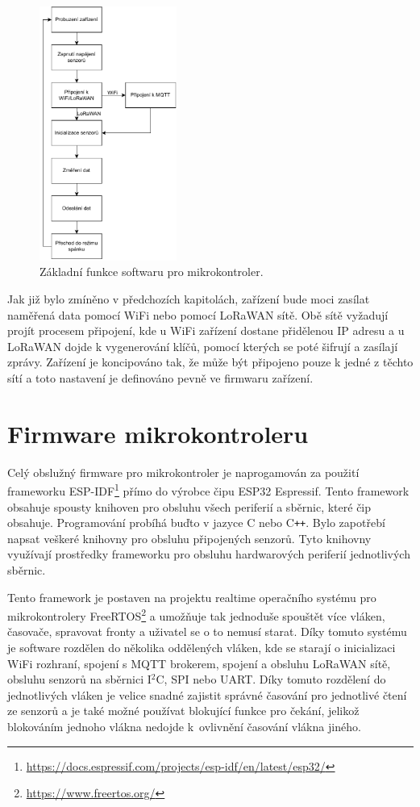 \begin{figure}[h]
    \centering
    \includegraphics[width=0.4\textwidth]{obrazky/flowchart.pdf}
    \caption{Základní funkce softwaru pro mikrokontroler.}
    \label{fig_flowchart}
\end{figure}

Jak již bylo zmíněno v předchozích kapitolách, zařízení bude moci zasílat naměřená data pomocí WiFi nebo pomocí LoRaWAN sítě. Obě sítě vyžadují projít procesem připojení, kde u WiFi zařízení dostane přidělenou IP adresu a u LoRaWAN dojde k vygenerování klíčů, pomocí kterých se poté šifrují a zasílají zprávy. Zařízení je koncipováno tak, že může být připojeno pouze k jedné z těchto sítí a toto nastavení je definováno pevně ve firmwaru zařízení. 

\section{Firmware mikrokontroleru}

Celý obslužný firmware pro mikrokontroler je naprogamován za použití frameworku ESP-IDF\footnote{\url{https://docs.espressif.com/projects/esp-idf/en/latest/esp32/}} přímo do výrobce čipu ESP32 Espressif. Tento framework obsahuje spou\-sty knihoven pro obsluhu všech periferií a sběrnic, které čip obsahuje. Programování probíhá buďto v jazyce C nebo C\texttt{++}. Bylo zapotřebí napsat veškeré knihovny pro obsluhu připojených senzorů. Tyto knihovny využívají prostředky frameworku pro obsluhu hardwarových periferií jednotlivých sběrnic.

Tento framework je postaven na projektu realtime operačního systému pro mikrokontrolery FreeRTOS\footnote{\url{https://www.freertos.org/}} a umožňuje tak jednoduše spouštět více vláken, časovače, spravovat fronty a uživatel se o to nemusí starat. Díky tomuto systému je software rozdělen do několika oddělených vláken, kde se starají o inicializaci WiFi rozhraní, spojení s MQTT brokerem, spojení a obsluhu LoRaWAN sítě, obsluhu senzorů na sběrnici I$^2$C, SPI nebo UART. Díky tomuto rozdělení do jednotlivých vláken je velice snadné zajistit správné časování pro jednotlivé čtení ze senzorů a je také možné používat blokující funkce pro čekání, jelikož blokováním jednoho vlákna nedojde k~ovlivnění časování vlákna jiného.

